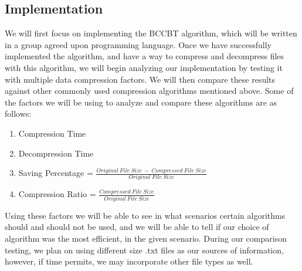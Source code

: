 \documentclass[11pt]{article}
\begin{document}
\subsection*{Implementation}
We will first focus on implementing the BCCBT algorithm, which will be written in a
group agreed upon programming language.
Once we have successfully implemented the algorithm, and have a way to compress and 
decompress files with this algorithm,
we will begin analyzing our implementation by testing it with multiple data compression factors.
We will then compare these results against other commonly used compression algorithms mentioned above.
Some of the factors we will be using to analyze and compare these algorithms are as follows:
      \begin{enumerate}
            \item Compression Time 
            \item Decompression Time
            \item Saving Percentage = $\frac{Original\ File\ Size\ -\ Compressed\ File\ Size}{Original\ File\ Size}$
            \item Compression Ratio = $\frac{Compressed\ File\ Size}{Original\ File\ Size}$
      \end{enumerate}
Using these factors we will be able to see in what scenarios certain algorithms should and should not be used,
and we will be able to tell if our choice of algorithm was the most efficient, in the given scenario.
During our comparison testing, we plan on using different size .txt files
as our sources of information, however, if time permits, we may incorporate other file types as well.



\end{document}
